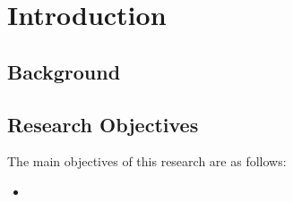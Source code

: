 

\section{Introduction}

\subsection{Background}

\subsection{Research Objectives}

The main objectives of this research are as follows:
\begin{itemize}
    \item 
\end{itemize}